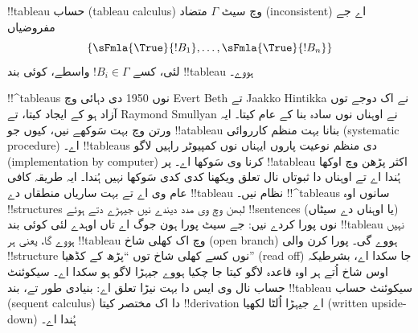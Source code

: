 \documentclass[../../../include/open-logic-section]{subfiles}
\begin{document}
!!{tableau} حساب (tableau calculus) وچ سیٹ $\Gamma$ متضاد
(inconsistent) اے جے مفروضیاں
\[
\{\sFmla{\True}{!B_1}, \dots, \sFmla{\True}{!B_n}\}
\]
لئی، کسے $!B_i \in \Gamma$ واسطے، کوئی بند !!{tableau} ہووے۔

!!^{tableau}s نوں 1950 دی دہائی وچ Evert Beth تے Jaakko Hintikka
نے اک دوجے توں آزاد ہو کے ایجاد کیتا، تے Raymond Smullyan نے اوہناں
نوں سادہ بنا کے عام کیتا۔ ایہ ورتن وچ بہت سَوکھے نیں، کیوں جو
!!a{tableau} بنانا بہت منظم کارروائی (systematic procedure) اے۔
!!{tableau}s دی منظم نوعیت پاروں ایہناں نوں کمپیوٹر راہیں لاگو
(implementation by computer) کرنا وی سَوکھا اے۔ پر
!!a{tableau} اکثر پڑھن وچ اوکھا ہُندا اے تے اوہناں دا ثبوتاں نال تعلق
ویکھنا کدی کدی سَوکھا نہیں ہُندا۔ ایہ طریقہ کافی عام وی اے تے بہت
ساریاں منطقاں دے !!{tableau} نظام نیں۔ !!^{tableau}s سانوں اوہ
!!{structure}s لبھن وچ وی مدد دیندے نیں جیہڑے دتے ہوئے !!{sentence}s
(یا اوہناں دے سیٹاں) نوں پورا کردے نیں: جے سیٹ پورا ہون جوگ اے تاں
اوہدے لئی کوئی بند !!{tableau} نہیں ہووے گا، یعنی ہر !!{tableau} وچ
اک کھلی شاخ (open branch) ہووے گی۔ پورا کرن والی !!{structure} نوں کسے
کھلی شاخ توں ``پڑھ کے کڈھیا'' (read off) جا سکدا اے، بشرطیکہ اوس شاخ اُتے ہر اوہ قاعدہ
لاگو کیتا جا چکیا ہووے جیہڑا لاگو ہو سکدا اے۔ سیکوئنٹ حساب نال وی
ایس دا بہت نیڑا تعلق اے: بنیادی طور تے، بند !!{tableau} سیکوئنٹ حساب
(sequent calculus) دا اک مختصر کیتا !!{derivation} اے جیہڑا اُلٹا لکھیا
(written upside-down) ہُندا اے۔
\end{document}
